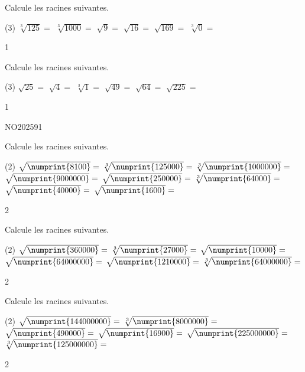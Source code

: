 \documentclass[a4paper,11pt]{report}
\begin{document}
\begin{exop}{ 
Calcule les racines suivantes.
\begin{tasks}(3)
    \task $\sqrt[3]{125}=$
    \task $\sqrt[3]{1000}=$
    \task $\sqrt{9}=$
    \task $\sqrt{16}=$
    \task $\sqrt{169}=$
    \task $\sqrt[3]{0}=$
\end{tasks}
}{1}
\end{exop}

\begin{exop}{ 
Calcule les racines suivantes.
\begin{tasks}(3)
    \task $\sqrt{25}=$
    \task $\sqrt{4}=$
    \task $\sqrt[3]{1}=$
    \task $\sqrt{49}=$
    \task $\sqrt{64}=$
    \task $\sqrt{225}=$
\end{tasks}
}{1}
\end{exop}

\begin{exof}{NO202}{59}{1} %
\end{exof}


\begin{exop}{ 
Calcule les racines suivantes.
\begin{tasks}(2)
    \task $\sqrt{\numprint{8100}}=$
    \task $\sqrt[3]{\numprint{125000}}=$
    \task $\sqrt[3]{\numprint{1000000}}=$
    \task $\sqrt{\numprint{9000000}}=$
    \task $\sqrt{\numprint{250000}}=$
    \task $\sqrt[3]{\numprint{64000}}=$
    \task $\sqrt{\numprint{40000}}=$
    \task $\sqrt{\numprint{1600}}=$
\end{tasks}
}{2}
\end{exop}


\begin{exop}{ 
Calcule les racines suivantes.
\begin{tasks}(2)
    \task $\sqrt{\numprint{360000}}=$
    \task $\sqrt[3]{\numprint{27000}}=$
    \task $\sqrt{\numprint{10000}}=$
    \task $\sqrt{\numprint{64000000}}=$
    \task $\sqrt{\numprint{1210000}}=$
    \task $\sqrt[3]{\numprint{64000000}}=$
\end{tasks}
}{2}
\end{exop}



\begin{exop}{ 
Calcule les racines suivantes.
\begin{tasks}(2)
    \task $\sqrt{\numprint{144000000}}=$
    \task $\sqrt[3]{\numprint{8000000}}=$
    \task $\sqrt{\numprint{490000}}=$
    \task $\sqrt{\numprint{16900}}=$
    \task $\sqrt{\numprint{225000000}}=$
    \task $\sqrt[3]{\numprint{125000000}}=$
    
\end{tasks}
}{2}
\end{exop}
\end{document}
